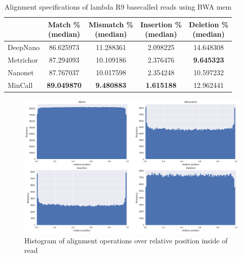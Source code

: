 \documentclass[runningheads,a4paper]{llncs}
\begin{document}
\begin{table}[]
    \caption{Alignment specifications of lambda R9 basecalled reads using BWA mem}
    \label{tbl:lambda_rates_bwa}
    \centering
    \begin{tabular}{lcccc}
        \toprule
        {} &  \thead{Match \% \\(median)} &  \thead{Mismatch \% \\(median)} &  \thead{Insertion \% \\(median)} &  \thead{Deletion \% \\(median)} \\
        \midrule

        DeepNano   &                  86.625973 &                     11.288361 &                       2.098225 &                     14.648308 \\
        Metrichor  &                  87.294093 &                     10.109186 &                       2.376476 &                      \textbf{9.645323 }\\
        Nanonet    &                  87.767037 &                     10.017598 &                       2.354248 &                     10.597232 \\
        MinCall    &                 \textbf{ 89.049870} &                     \textbf{ 9.480883} &                       \textbf{1.615188 }&                     12.962441 \\
        \bottomrule
    \end{tabular}
\end{table}


\begin{figure}[!ht]
    \begin{center}
        \includegraphics[width=1\textwidth]{./imgs/operation_distributed_r9.png}
        \caption{Histogram of alignment operations over relative position inside of read}
        \label{fg:cigar_op_dist}
    \end{center}
\end{figure}
\end{document}

